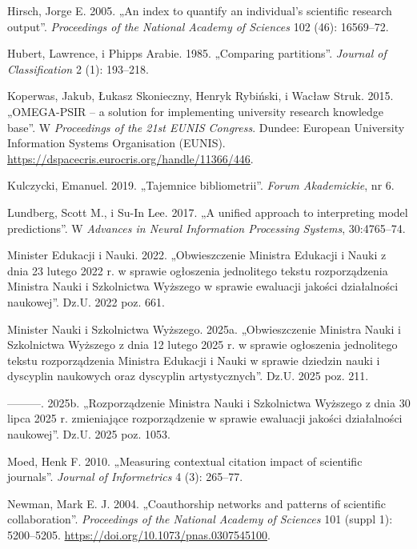 \documentclass[
  polish,
  12pt,
  a4paper,
]{article}
\newlength{\cslhangindent}
\newenvironment{CSLReferences}[2] %
 {\begin{list}{}{%
  \setlength{\itemindent}{0pt}
  \setlength{\leftmargin}{0pt}
  \setlength{\parsep}{0pt}
  \ifodd #1
   \setlength{\leftmargin}{\cslhangindent}
   \setlength{\itemindent}{-1\cslhangindent}
  \fi
  \setlength{\itemsep}{#2\baselineskip}}}
 {\end{list}}
\begin{document}
\begin{CSLReferences}{1}{0}
Hirsch, Jorge E. 2005. {„An index to quantify an individual's scientific
research output''}. \emph{Proceedings of the National Academy of
Sciences} 102 (46): 16569--72.

Hubert, Lawrence, i Phipps Arabie. 1985. {„Comparing partitions''}.
\emph{Journal of Classification} 2 (1): 193--218.

Koperwas, Jakub, Łukasz Skonieczny, Henryk Rybiński, i Wacław Struk.
2015. {„{OMEGA-PSIR} -- a solution for implementing university research
knowledge base''}. W \emph{Proceedings of the 21st EUNIS Congress}.
Dundee: European University Information Systems Organisation (EUNIS).
\url{https://dspacecris.eurocris.org/handle/11366/446}.

Kulczycki, Emanuel. 2019. {„Tajemnice bibliometrii''}. \emph{Forum
Akademickie}, nr 6.

Lundberg, Scott M., i Su-In Lee. 2017. {„A unified approach to
interpreting model predictions''}. W \emph{Advances in Neural
Information Processing Systems}, 30:4765--74.

Minister Edukacji i Nauki. 2022. {„Obwieszczenie Ministra Edukacji i
Nauki z dnia 23 lutego 2022 r. w sprawie ogłoszenia jednolitego tekstu
rozporządzenia Ministra Nauki i Szkolnictwa Wyższego w sprawie ewaluacji
jakości działalności naukowej''}. Dz.U. 2022 poz. 661.

Minister Nauki i Szkolnictwa Wyższego. 2025a. {„Obwieszczenie Ministra
Nauki i Szkolnictwa Wyższego z dnia 12 lutego 2025 r. w sprawie
ogłoszenia jednolitego tekstu rozporządzenia Ministra Edukacji i Nauki w
sprawie dziedzin nauki i dyscyplin naukowych oraz dyscyplin
artystycznych''}. Dz.U. 2025 poz. 211.

---------. 2025b. {„Rozporządzenie Ministra Nauki i Szkolnictwa Wyższego
z dnia 30 lipca 2025 r. zmieniające rozporządzenie w sprawie ewaluacji
jakości działalności naukowej''}. Dz.U. 2025 poz. 1053.

Moed, Henk F. 2010. {„Measuring contextual citation impact of scientific
journals''}. \emph{Journal of Informetrics} 4 (3): 265--77.

Newman, Mark E. J. 2004. {„Coauthorship networks and patterns of
scientific collaboration''}. \emph{Proceedings of the National Academy
of Sciences} 101 (suppl 1): 5200--5205.
\url{https://doi.org/10.1073/pnas.0307545100}.


\end{CSLReferences}
\end{document}
